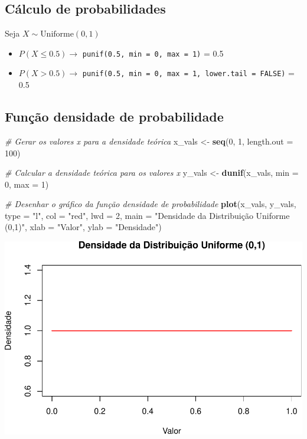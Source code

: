 \documentclass[
]{book}
\newenvironment{Shaded}{\begin{snugshade}}{\end{snugshade}}
\newcommand{\AttributeTok}[1]{\textcolor[rgb]{0.13,0.29,0.53}{#1}}
\newcommand{\CommentTok}[1]{\textcolor[rgb]{0.56,0.35,0.01}{\textit{#1}}}
\newcommand{\DecValTok}[1]{\textcolor[rgb]{0.00,0.00,0.81}{#1}}
\newcommand{\FunctionTok}[1]{\textcolor[rgb]{0.13,0.29,0.53}{\textbf{#1}}}
\newcommand{\NormalTok}[1]{#1}
\newcommand{\OtherTok}[1]{\textcolor[rgb]{0.56,0.35,0.01}{#1}}
\newcommand{\StringTok}[1]{\textcolor[rgb]{0.31,0.60,0.02}{#1}}
\begin{document}
\subsection{Cálculo de probabilidades}\label{cuxe1lculo-de-probabilidades-3}

Seja \(X\sim \text{Uniforme}(0,1)\)

\begin{itemize}
\item
  \(P(X\leq 0.5) \to\) \texttt{punif(0.5,\ min\ =\ 0,\ max\ =\ 1)} = 0.5
\item
  \(P(X > 0.5) \to\) \texttt{punif(0.5,\ min\ =\ 0,\ max\ =\ 1,\ lower.tail\ =\ FALSE)}
  = 0.5
\end{itemize}

\subsection{Função densidade de probabilidade}\label{funuxe7uxe3o-densidade-de-probabilidade}

\begin{Shaded}
\begin{Highlighting}[]
\CommentTok{\# Gerar os valores x para a densidade teórica}
\NormalTok{x\_vals }\OtherTok{\textless{}{-}} \FunctionTok{seq}\NormalTok{(}\DecValTok{0}\NormalTok{, }\DecValTok{1}\NormalTok{, }\AttributeTok{length.out =} \DecValTok{100}\NormalTok{)}

\CommentTok{\# Calcular a densidade teórica para os valores x}
\NormalTok{y\_vals }\OtherTok{\textless{}{-}} \FunctionTok{dunif}\NormalTok{(x\_vals, }\AttributeTok{min =} \DecValTok{0}\NormalTok{, }\AttributeTok{max =} \DecValTok{1}\NormalTok{)}

\CommentTok{\# Desenhar o gráfico da função densidade de probabilidade}
\FunctionTok{plot}\NormalTok{(x\_vals, y\_vals, }\AttributeTok{type =} \StringTok{"l"}\NormalTok{, }
     \AttributeTok{col =} \StringTok{"red"}\NormalTok{, }\AttributeTok{lwd =} \DecValTok{2}\NormalTok{, }
     \AttributeTok{main =} \StringTok{"Densidade da Distribuição Uniforme (0,1)"}\NormalTok{,}
     \AttributeTok{xlab =} \StringTok{"Valor"}\NormalTok{, }\AttributeTok{ylab =} \StringTok{"Densidade"}\NormalTok{)}
\end{Highlighting}
\end{Shaded}

\includegraphics{introR_files/figure-latex/unnamed-chunk-260-1.pdf}
\end{document}
